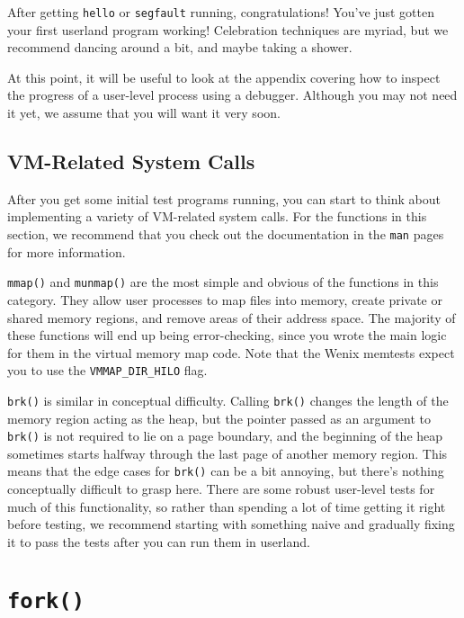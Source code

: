 After getting \texttt{hello} or \texttt{segfault} running, congratulations! You've just gotten your first userland program working! Celebration techniques are myriad, but we recommend dancing around a bit, and maybe taking a shower.

At this point, it will be useful to look at the  appendix covering how to inspect the progress of a user-level process using a debugger. Although you may not need it yet, we assume that you will want it very soon.

\subsection{VM-Related System Calls}

After you get some initial test programs running, you can start to think about implementing a variety of VM-related system calls. For the functions in this section, we recommend that you check out the documentation in the \texttt{man} pages for more information.

\texttt{mmap()} and \texttt{munmap()} are the most simple and obvious of the functions in this category. They allow user processes to map files into memory, create private or shared memory regions, and remove areas of their address space. The majority of these functions will end up being error-checking, since you wrote the main logic for them in the virtual memory map code.  Note that the Wenix memtests expect you to use the \texttt{VMMAP\_DIR\_HILO} flag.

\texttt{brk()} is similar in conceptual difficulty. Calling \texttt{brk()} changes the length of the memory region acting as the heap, but the pointer passed as an argument to \texttt{brk()} is not required to lie on a page boundary, and the beginning of the heap sometimes starts halfway through the last page of another memory region. This means that the edge cases for \texttt{brk()} can be a bit annoying, but there's nothing conceptually difficult to grasp here. There are some robust user-level tests for much of this functionality, so rather than spending a lot of time getting it right before testing, we recommend starting with something naive and gradually fixing it to pass the tests after you can run them in userland.

\section{\texttt{fork()}}

